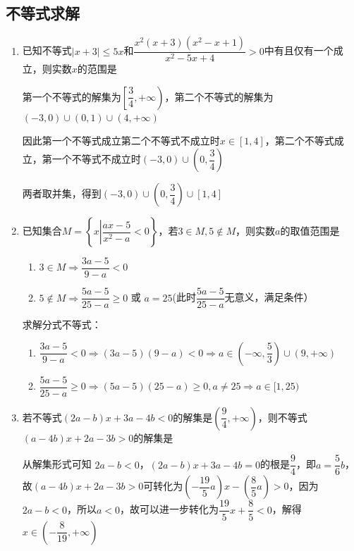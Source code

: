 \subsection*{不等式求解}
\begin{enumerate}
    \item 已知不等式$|x+3| \leq 5x$和$\dfrac{x^2(x+3)(x^2-x+1)}{x^2 - 5x + 4} > 0$中有且仅有一个成立，则实数$x$的范围是
    \begin{jieda}
        第一个不等式的解集为$\left[\dfrac{3}{4}, +\infty\right)$，第二个不等式的解集为$(-3, 0) \cup (0, 1) \cup (4, +\infty)$

        因此第一个不等式成立第二个不等式不成立时$x \in [1, 4]$，第二个不等式成立，第一个不等式不成立时$(-3, 0) \cup \left(0, \dfrac{3}{4}\right)$

        两者取并集，得到$(-3, 0) \cup \left(0, \dfrac{3}{4}\right) \cup [1, 4]$ 
    \end{jieda}

    \item 已知集合$M = \left\{x \left| \dfrac{ax- 5}{x^2-a} < 0\right. \right\}$，若$3 \in M, 5 \notin M$，则实数$a$的取值范围是
    \begin{jieda}
        \begin{enumerate}
            \item $3 \in M \Longrightarrow \dfrac{3a - 5}{9-a} < 0$
            \item $5 \notin M \Longrightarrow \dfrac{5a - 5}{25-a} \geq 0$ 或 $a = 25$(此时$\dfrac{5a - 5}{25-a}$无意义，满足条件）
        \end{enumerate}
        求解分式不等式：
        \begin{enumerate}
            \item $\dfrac{3a - 5}{9-a} < 0 \Longrightarrow (3a-5)(9-a) < 0 \Longrightarrow a \in \left(-\infty, \dfrac{5}{3}\right) \cup (9, +\infty)$
            \item $\dfrac{5a - 5}{25-a} \geq 0 \Longrightarrow (5a-5)(25-a) \geq 0, a \neq 25 \Longrightarrow a \in [1, 25)$
        \end{enumerate}
    \end{jieda}

    \item 若不等式$(2a-b)x +3a - 4b < 0$的解集是$\left(\dfrac{9}{4}, +\infty\right)$，则不等式$(a-4b)x + 2a - 3b > 0$的解集是
    \begin{jieda}
        从解集形式可知 $2a-b < 0$，$(2a-b)x +3a - 4b = 0$的根是$\dfrac{9}{4}$，即$a = \dfrac{5}{6}b$，故$(a-4b)x + 2a - 3b > 0$可转化为$\left(-\dfrac{19}{5}a\right)x - \left(\dfrac{8}{5}a\right) > 0$，因为$2a-b < 0$，所以$a < 0$，故可以进一步转化为$\dfrac{19}{5}x + \dfrac{8}{5} < 0$，解得$x \in \left(-\dfrac{8}{19}, +\infty\right)$
    \end{jieda}


\end{enumerate}
